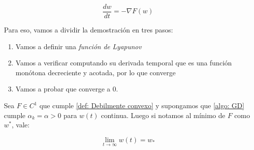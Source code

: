 \begin{equation}
\label{eq: Ecuacion diferencial de descenso de gradiente}
\dfrac{d w}{dt} = - \nabla F(w)
\end{equation}

Para eso, vamos a dividir la demostraci\'on en tres pasos:


\begin{enumerate}
	\item Vamos a definir una \textit{funci\'on de Lyapunov}
	\item Vamos a verificar computando su derivada temporal que es una funci\'on mon\'otona decreciente y acotada, por lo que converge
	\item Vamos a probar que converge a 0.
\end{enumerate}

\begin{proposition}
	\label{Objetivo debilmente convexo, GD continue converge}
	Sea $F \in C^1$ que cumple \ref{def: Debilmente convexo} y supongamos que \ref{algo: GD} cumple $\alpha_k=\alpha>0$ para $w(t)$ continua. Luego si notamos al m\'inimo de $F$ como $w^*$, vale:
	
	\begin{equation*}
		\lim\limits_{t \rightarrow \infty} w(t) =  w_*
	\end{equation*}

\end{proposition}

